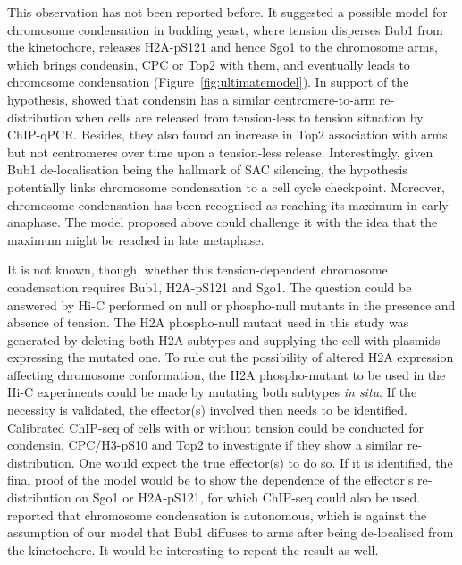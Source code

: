 This observation has not been reported before. It suggested a possible model for chromosome condensation in budding yeast, where tension disperses Bub1 from the kinetochore, releases H2A-pS121 and hence Sgo1 to the chromosome arms, which brings condensin, CPC or Top2 with them, and eventually leads to chromosome condensation (Figure~\ref{fig:ultimatemodel}). In support of the hypothesis, \cite{Leonard2015} showed that condensin has a similar centromere-to-arm re-distribution when cells are released from tension-less to tension situation by ChIP-qPCR. Besides, they also found an increase in Top2 association with arms but not centromeres over time upon a tension-less release. Interestingly, given Bub1 de-localisation being the hallmark of SAC silencing, the hypothesis potentially links chromosome condensation to a cell cycle checkpoint. Moreover, chromosome condensation has been recognised as reaching its maximum in early anaphase\cite{Mora-Bermudez2007MaximalKinase}. The model proposed above could challenge it with the idea that the maximum might be reached in late metaphase. 

It is not known, though, whether this tension-dependent chromosome condensation requires Bub1, H2A-pS121 and Sgo1. The question could be answered by Hi-C performed on null or phospho-null mutants in the presence and absence of tension. The H2A phospho-null mutant used in this study was generated by deleting both H2A subtypes and supplying the cell with plasmids expressing the mutated one. To rule out the possibility of altered H2A expression affecting chromosome conformation, the H2A phospho-mutant to be used in the Hi-C experiments could be made by mutating both subtypes \textit{in situ}. If the necessity is validated, the effector(s) involved then needs to be identified. Calibrated ChIP-seq of cells with or without tension could be conducted for condensin, CPC/H3-pS10 and Top2 to investigate if they show a similar re-distribution. One would expect the true effector(s) to do so. If it is identified, the final proof of the model would be to show the dependence of the effector's re-distribution on Sgo1 or H2A-pS121, for which ChIP-seq could also be used. \cite{Kruitwagen2015a} reported that chromosome condensation is autonomous, which is against the assumption of our model that Bub1 diffuses to arms after being de-localised from the kinetochore. It would be interesting to repeat the result as well. 

